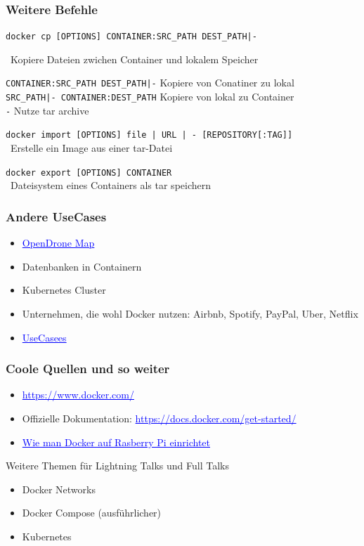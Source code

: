 \documentclass[22pt]{beamer}
\renewcommand{\href}[2]{\textcolor{blue}{\uline{#2}}}
\newcommand{\code}[1]{\colorbox{gray!10}{\texttt{#1}}}
\begin{document}
\begin{frame}[fragile]
    \frametitle{Weitere Befehle}
    \code{docker cp [OPTIONS] CONTAINER:SRC\_PATH DEST\_PATH|-}

    \- \ Kopiere Dateien zwichen Container und lokalem Speicher\vspace{5pt}

    \code{CONTAINER:SRC\_PATH DEST\_PATH|-} Kopiere von Conatiner zu lokal\\
    \code{SRC\_PATH|- CONTAINER:DEST\_PATH} Kopiere von lokal zu Container\\
    \code{-} Nutze tar archive
    \medskip\medskip
    
    \code{docker import [OPTIONS] file | URL | - [REPOSITORY[:TAG]]}\\
    \-  \ Erstelle ein Image aus einer tar-Datei  \medskip

    \code{docker export [OPTIONS] CONTAINER}\\
    \-  \ Dateisystem eines Containers als tar speichern \medskip

\end{frame}

\begin{frame}[t]
    \frametitle{Andere UseCases}
    \begin{itemize}
        \item \href{https://github.com/OpenDroneMap/WebODM?tab=readme-ov-file}{OpenDrone Map}
        \item Datenbanken in Containern
        \item Kubernetes Cluster
        \item Unternehmen, die wohl Docker nutzen: Airbnb, Spotify, PayPal, Uber, Netflix
        \item \href{https://www.simplilearn.com/docker-use-cases-article}{UseCasees}
    \end{itemize}
\end{frame}

\begin{frame}[t]
    \frametitle{Coole Quellen und so weiter}
    \begin{itemize}
        \item \href{https://www.docker.com/}{https://www.docker.com/}
        \item Offizielle Dokumentation: \href{https://docs.docker.com/get-started/}{https://docs.docker.com/get-started/}
        \item \href{https://www.heise.de/news/Wie-man-Docker-auf-dem-Raspberry-Pi-in-15-Minuten-einrichtet-7524692.html}{Wie man Docker auf Rasberry Pi einrichtet}
    \end{itemize} 
    \begin{block}{Weitere Themen für Lightning Talks und Full Talks}
        \begin{itemize}
            \item Docker Networks
            \item Docker Compose (ausführlicher)
            \item Kubernetes
        \end{itemize}
        
    \end{block}
\end{frame}
\end{document}
